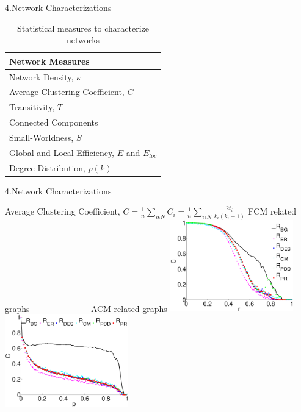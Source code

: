\documentclass{beamer}
\begin{document}
\begin{frame}{4.Network Characterizations}

	
	\begin{table}[h]
		\begin{center}
\caption[Statistical measures to characterize networks]{Statistical measures to characterize networks}
\begin{tabular}{ l  }
  Network Measures\\
  \hline  \hline                     
  		Network Density, $\kappa$ \\ \hline
  		Average Clustering Coefficient, $C$ \\ \hline
  		Transitivity, $T$ \\ \hline
  		Connected Components \\ \hline  
  		Small-Worldness, $S$ \\ \hline
  		Global and Local Efficiency, $E$ and $E_{loc}$  \\ \hline
  		Degree Distribution, $p(k)$ \\ \hline
  \hline  
\end{tabular}
\label{table:Statistical measures to characterize networks}
		\end{center}
	\end{table}	
	

\end{frame}


\begin{frame}{4.Network Characterizations}

{Average Clustering Coefficient, $C = \frac{1}{n} \sum\limits_{i\epsilon N}C_i = \frac{1}{n}\sum\limits_{i\epsilon N} \frac{2t_i}{k_i(k_i -1)}$} 
\break
\break
\break
\footnotesize{FCM related graphs ~~~~~~~~~~~~~ ACM related graphs}
	\centering	
	\includegraphics[width=0.40\textwidth]{Figures/Clustering_Coefficient_Fnc.eps}
	\includegraphics[width=0.40\textwidth]{Figures/Clustering_Coefficient_Stru.eps} 
\end{frame}
\end{document}
